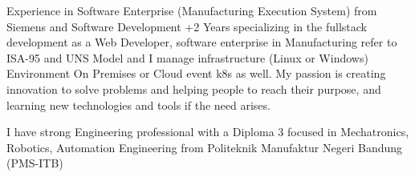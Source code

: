 

\begin{cvparagraph}

Experience in Software Enterprise (Manufacturing Execution System) from Siemens and Software Development +2 Years specializing in the fullstack development as a Web Developer, software enterprise in Manufacturing refer to ISA-95 and UNS Model and I manage infrastructure (Linux or Windows) Environment On Premises or Cloud event k8s as well.
My passion is creating innovation to solve problems and helping people to reach their purpose, and learning new technologies and tools if the need arises.

I have strong Engineering professional with a Diploma 3 focused in Mechatronics, Robotics, Automation Engineering from Politeknik Manufaktur Negeri Bandung (PMS-ITB)
\end{cvparagraph}
